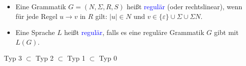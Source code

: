 \documentclass{scrreprt}
\begin{document}
\begin{Definition}
\noindent
\begin{itemize}
\item
Eine Grammatik $G=(N,\Sigma,R,S)$ heißt \textcolor{blue}{regulär} (oder rechtslinear), wenn für jede Regel $u\rightarrow v$ in $R$ gilt: $|u| \in N$ und $v\in\{\varepsilon\}\cup\Sigma\cup\Sigma N$.
\item
Eine Sprache $L$ heißt \textcolor{blue}{regulär}, falls es eine reguläre Grammatik $G$ gibt mit $L(G)$.
\end{itemize}
\end{Definition}

\begin{Satz}
Typ 3 $\subset$ Typ 2 $\subset$ Typ 1 $\subset$ Typ 0
\end{Satz}
\end{document}

